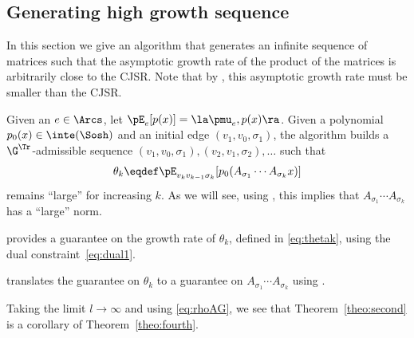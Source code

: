 \subsection{Generating high growth sequence}
\label{sec:algo}
In this section we give an algorithm that generates an infinite
sequence of matrices such that the asymptotic growth rate of the
product of the matrices is arbitrarily close to the CJSR.
Note that by , this asymptotic growth rate must be
smaller than the CJSR.


Given an \arc{} $e \in \Arcs$, let $\pE_e[p(x)] = \la \pmu_e, p(x) \ra$.
Given a polynomial $p_0(x) \in \inte(\Sosh)$ and an initial edge $(v_1,v_0,\sigma_1)$,
the algorithm builds a $\G^\Tr$-admissible
sequence $(v_1,v_0,\sigma_1),\allowbreak(v_2,v_1,\sigma_2), \ldots$ such that
\begin{equation}
	\label{eq:thetak}
  \theta_k \eqdef \pE_{v_{k}v_{k-1}\sigma_k}[p_0(A_{\sigma_1} \cdots A_{\sigma_k}x)]
\end{equation}
remains ``large'' for increasing $k$.
As we will see, using ,
this implies that $A_{\sigma_1} \cdots A_{\sigma_k}$ has a ``large'' norm.










 provides a guarantee on the growth rate of $\theta_k$, defined in \eqref{eq:thetak},
using the dual constraint~\eqref{eq:dual1}.




 translates the guarantee on $\theta_k$ to a guarantee on $A_{\sigma_1} \cdots A_{\sigma_k}$ using .



Taking the limit $l \to \infty$ and using \eqref{eq:rhoAG}, we see
that Theorem~\ref{theo:second} is a corollary of
Theorem~\ref{theo:fourth}.






